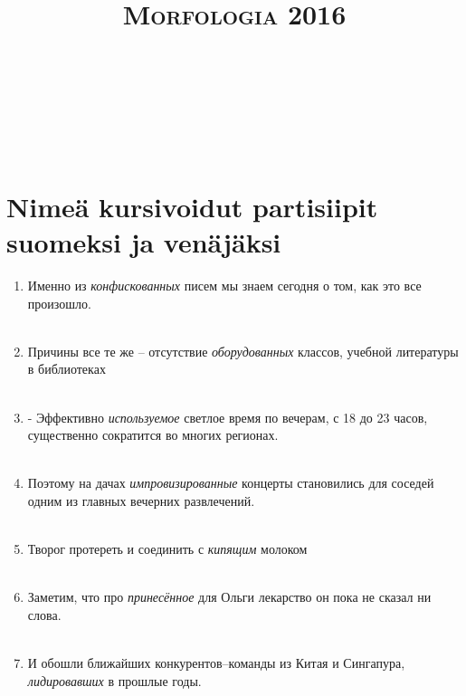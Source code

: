 \documentclass[paper=a4, fontsize=11pt]{scrartcl}
\title{	
\normalfont \normalsize 
\textsc{Morfologia 2016} \\ [25pt] 
\horrule{0.5pt} \\[0.4cm] 
\huge  \\ 
\horrule{2pt} \\[0.5cm] 
}
\date{}
\begin{document}
\onehalfspacing

\section{Nimeä kursivoidut partisiipit suomeksi ja venäjäksi}\label{kuxe4uxe4nnuxe4-venuxe4juxe4ksi}

\begin{enumerate}
    \item Именно из \emph{конфискованных} писем мы знаем сегодня о том, как это все произошло. \\
    \underline{\hspace{12cm}} \\
    \item Причины все те же -- отсутствие \emph{оборудованных} классов, учебной литературы в библиотеках\\
    \underline{\hspace{12cm}} \\
    \item - Эффективно \emph{используемое} светлое время по вечерам, с 18 до 23 часов, существенно сократится во многих регионах. \\
    \underline{\hspace{12cm}} \\
    \item Поэтому на дачах \emph{импровизированные} концерты становились для соседей одним из главных вечерних развлечений.  \\
    \underline{\hspace{12cm}} \\
    \item Творог протереть и соединить с \emph{кипящим} молоком \\
    \underline{\hspace{12cm}} \\
    \item Заметим, что про \emph{принесённое} для Ольги лекарство он пока не сказал ни слова. \\
    \underline{\hspace{12cm}} \\
    \item И обошли ближайших конкурентов--команды из Китая и Сингапура, \emph{лидировавших} в прошлые годы. \\
    \underline{\hspace{12cm}} \\

\end{enumerate}
\end{document}
